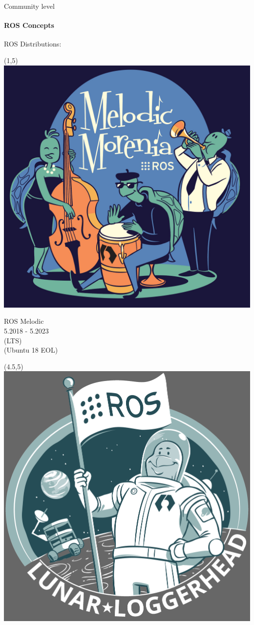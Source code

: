 \documentclass{beamer}
\begin{document}
\begin{frame}{Community level}
    \framesubtitle{ROS Concepts}
    {\huge ROS Distributions:}
    \vspace{7.0cm}
     \begin{textblock}{3}(1,5)
        \includegraphics[width = 1.0\linewidth]{figures/melodic.jpg}
        
        \centering
        ROS Melodic\\
        \footnotesize 5.2018 - 5.2023\\
        (LTS)\\
        (Ubuntu 18 EOL)
        
     \end{textblock}
     \begin{textblock}{3}(4.5,5)
         \includegraphics[width = 1.0\linewidth]{figures/lunar.png}
         

\end{textblock}
\end{frame}
\end{document}
